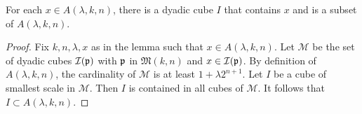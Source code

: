 \begin{lemma}
\label{dyadic-union}
\leanok
{}
For each $x\in A(\lambda,k,n)$,
there is a dyadic cube $I$
that contains $x$ and is
a subset of
$A(\lambda,k,n)$.
\end{lemma}

\begin{proof}
\leanok
Fix $k,n,\lambda,x$ as in the lemma such that $x\in A(\lambda,k,n)$.
Let $\mathcal{M}$ be the set of dyadic cubes ${\mathcal{I}}({\mathfrak p})$ with ${\mathfrak p}$ in $\mathfrak{M}(k,n)$ and $x\in {\mathcal{I}}({\mathfrak p})$.
By definition of $A(\lambda,k,n)$, the cardinality of $\mathcal{M}$ is at least $1+\lambda 2^{n+1}$.
Let $I$ be a cube of smallest scale in $\mathcal{M}$.
Then $I$ is contained in all cubes of $\mathcal{M}$.
It follows that $I\subset A(\lambda,k,n)$.
\end{proof}

